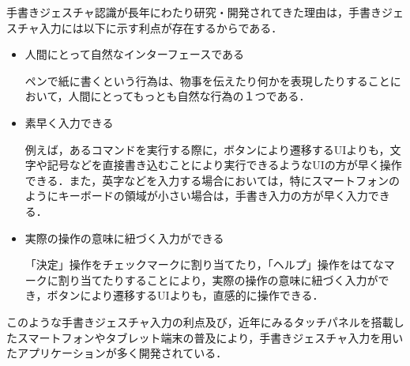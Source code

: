 手書きジェスチャ認識が長年にわたり研究・開発されてきた理由は，手書きジェスチャ入力には以下に示す利点が存在するからである．
\begin{itemize}
 \item 人間にとって自然なインターフェースである
 
ペンで紙に書くという行為は、物事を伝えたり何かを表現したりすることにおいて，人間にとってもっとも自然な行為の１つである．
 \item 素早く入力できる
 
例えば，あるコマンドを実行する際に，ボタンにより遷移するUIよりも，文字や記号などを直接書き込むことにより実行できるようなUIの方が早く操作できる．また，英字などを入力する場合においては，特にスマートフォンのようにキーボードの領域が小さい場合は，手書き入力の方が早く入力できる．
 \item 実際の操作の意味に紐づく入力ができる
 
 「決定」操作をチェックマークに割り当てたり，「ヘルプ」操作をはてなマークに割り当てたりすることにより，実際の操作の意味に紐づく入力ができ，ボタンにより遷移するUIよりも，直感的に操作できる．
\end{itemize}

このような手書きジェスチャ入力の利点及び，近年にみるタッチパネルを搭載したスマートフォンやタブレット端末の普及により，手書きジェスチャ入力を用いたアプリケーションが多く開発されている．

